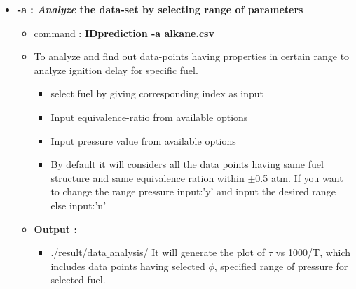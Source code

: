 \documentclass[12pt]{article}
\begin{document}
	\begin{itemize}[wide = 0pt, labelwidth = 1.3333em, labelsep = 0.3333em, leftmargin = \dimexpr{} + \relax ]%
	\item \textbf{-a : \textit{Analyze} the data-set by selecting range of parameters}\\
	
	\begin{itemize}[wide = 0pt, labelwidth = 1.3333em, labelsep = 0.3333em, leftmargin = \dimexpr{} + \relax ]%
	\item command : \textbf{IDprediction -a alkane.csv} \\
	\item To analyze and find out data-points having properties in certain range to analyze ignition delay for specific fuel.
	\begin{itemize}
		\item select fuel by giving corresponding index as input 
		\item Input equivalence-ratio  from available options
		\item Input pressure value from available options
		\item By default it will considers all the data points having same fuel structure and same equivalence ration within $\pm$0.5 atm. If you want to change the range pressure input:'y' and input the desired range else input:'n' \\
	\end{itemize}
	
	\item \textbf{Output :}
	\begin{itemize}
		\item  ./result/data$\_$analysis/
		\subitem  It will generate the plot of $\tau$ vs 1000/T, which includes data points having selected $\phi$, specified range of pressure for selected fuel.
	\end{itemize}
	\end{itemize}



\end{itemize}
\end{document}
